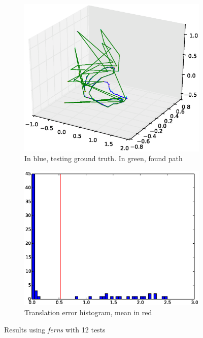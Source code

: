 \begin{figure}[htpb]
  \begin{subfigure}[b]{6cm}
          \includegraphics[width=\linewidth]{img/large_desktop/ferns_100_path.eps}
          \caption{In blue, testing ground truth. In green, found path}                
          \label{fig:large_desktop_ferns_path}
  \end{subfigure}   
  \qquad
  \begin{subfigure}[b]{6cm}
          \includegraphics[width=\linewidth]{img/large_desktop/ferns_100_dist.eps}
          \caption{Translation error histogram, mean in red} 
          \label{fig:large_desktop_ferns_dist}
  \end{subfigure}
  \caption{Results using \textit{ferns} with 12 tests}
\end{figure}



